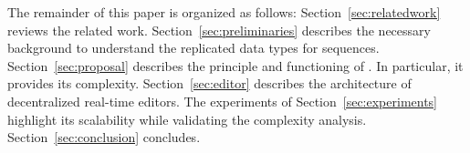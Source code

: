 The remainder of this paper is organized as follows:
Section~\ref{sec:relatedwork} reviews the related work.
Section~\ref{sec:preliminaries} describes the necessary background to understand
the replicated data types for sequences. Section~\ref{sec:proposal} describes
the principle and functioning of \LSEQ. In particular, it provides its
complexity. Section~\ref{sec:editor} describes the architecture of decentralized
real-time editors. The experiments of Section~\ref{sec:experiments} highlight
its scalability while validating the complexity analysis.
Section~\ref{sec:conclusion} concludes.

